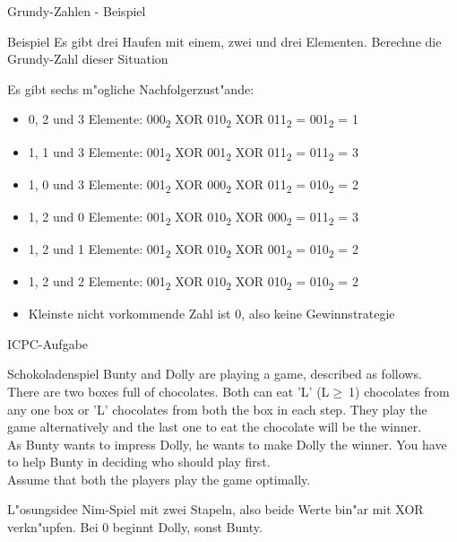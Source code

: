 \documentclass[18pt]{beamer}
\begin{document}
\begin{frame}{Grundy-Zahlen - Beispiel}
\begin{block}{Beispiel}
Es gibt drei Haufen mit einem, zwei und drei Elementen. Berechne die Grundy-Zahl dieser Situation
\end{block}
Es gibt sechs m"ogliche Nachfolgerzust"ande:
\begin{itemize}
\pause
\item 0, 2 und 3 Elemente: 000\textsubscript{2} XOR 010\textsubscript{2} XOR 011\textsubscript{2} = 001\textsubscript{2} = 1
\pause
\item 1, 1 und 3 Elemente: 001\textsubscript{2} XOR 001\textsubscript{2} XOR 011\textsubscript{2} = 011\textsubscript{2} = 3
\pause
\item 1, 0 und 3 Elemente: 001\textsubscript{2} XOR 000\textsubscript{2} XOR 011\textsubscript{2} = 010\textsubscript{2} = 2
\pause
\item 1, 2 und 0 Elemente: 001\textsubscript{2} XOR 010\textsubscript{2} XOR 000\textsubscript{2} = 011\textsubscript{2} = 3
\pause
\item 1, 2 und 1 Elemente: 001\textsubscript{2} XOR 010\textsubscript{2} XOR 001\textsubscript{2} = 010\textsubscript{2} = 2
\pause
\item 1, 2 und 2 Elemente: 001\textsubscript{2} XOR 010\textsubscript{2} XOR 010\textsubscript{2} = 010\textsubscript{2} = 2
\pause
\item Kleinste nicht vorkommende Zahl ist 0, also keine Gewinnstrategie
\end{itemize}
\end{frame}

\begin{frame}{ICPC-Aufgabe}
\begin{exampleblock}{Schokoladenspiel}
Bunty and Dolly are playing a game, described as follows.\\
There are two boxes full of chocolates. Both can eat 'L' (L$\geq\ $1) chocolates from any one box or 'L' chocolates from both the box in each step. They play the game alternatively and the last one to eat the chocolate will be the winner.\\
As Bunty wants to impress Dolly, he wants to make Dolly the winner. You have to help Bunty in deciding who should play first.\\
Assume that both the players play the game optimally.
\end{exampleblock}
\pause
\begin{block}{L"osungsidee}
Nim-Spiel mit zwei Stapeln, also beide Werte bin"ar mit XOR verkn"upfen.
Bei 0 beginnt Dolly, sonst Bunty.
\end{block}
\end{frame}
\end{document}
